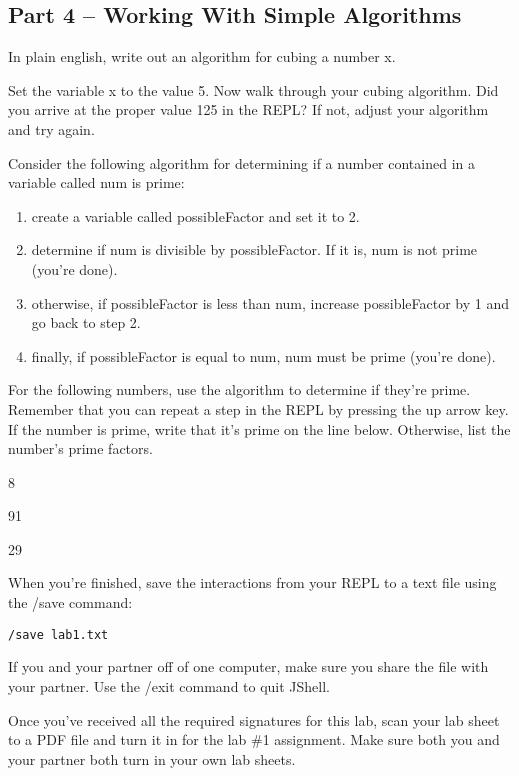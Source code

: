 \subsection{Part 4 -- Working With Simple Algorithms}

\begin{exer}
In plain english, write out an algorithm for cubing a number x. 

\evallinefour

Set the variable x to the value 5. Now walk through your cubing algorithm. 
Did you arrive at the proper value 125 in the REPL? If not, adjust your 
algorithm and try again. 
\end{exer}

\begin{exer}
Consider the following algorithm for determining if a number contained 
in a variable called num is prime:
\begin{enumerate}
\item create a variable called possibleFactor and set it to 2.
\item determine if num is divisible by possibleFactor. If it is, num is not prime (you're done).
\item otherwise, if possibleFactor is less than num, increase possibleFactor by 1 and go back to step 2. 
\item finally, if possibleFactor is equal to num, num must be prime (you're done).
\end{enumerate}

For the following numbers, use the algorithm to determine if they're prime. 
Remember that you can repeat a step in the REPL by pressing the up arrow key.
If the number is prime, write that it's prime on the line below. Otherwise, 
list the number's prime factors. 
\begin{sevalenum}
\item 8

\evalline

\item 91

\evalline

\item 29

\evalline
\end{sevalenum}

\end{exer}

When you're finished, save the interactions from your REPL to a text file using the /save command:

\begin{verbatim}
/save lab1.txt
\end{verbatim}

If you and your partner off of one computer, make sure you share the file with
your partner.  Use the /exit command to quit JShell.

\initialbox

Once you've received all the required signatures for this lab, scan your 
lab sheet to a PDF file and turn it in for the lab \#1 assignment. 
Make sure both you and your partner both turn in your own lab sheets. 